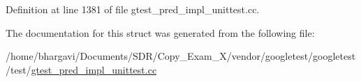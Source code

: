 Definition at line 1381 of file gtest\+\_\+pred\+\_\+impl\+\_\+unittest.\+cc.



The documentation for this struct was generated from the following file\+:\begin{DoxyCompactItemize}
\item 
/home/bhargavi/\+Documents/\+S\+D\+R/\+Copy\+\_\+\+Exam\+\_\+X/vendor/googletest/googletest/test/\hyperlink{gtest__pred__impl__unittest_8cc}{gtest\+\_\+pred\+\_\+impl\+\_\+unittest.\+cc}\end{DoxyCompactItemize}
